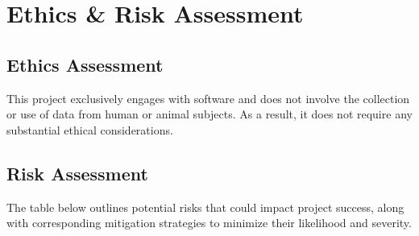 \newpage

\section{Ethics \& Risk Assessment}
\subsection{Ethics Assessment}
This project exclusively engages with software and does not involve the collection or use of data from human or animal subjects. As a result, it does not require any substantial ethical considerations.
\subsection{Risk Assessment}
The table below outlines potential risks that could impact project success, along with corresponding mitigation strategies to minimize their likelihood and severity.
\renewcommand{\arraystretch}{1.3}
